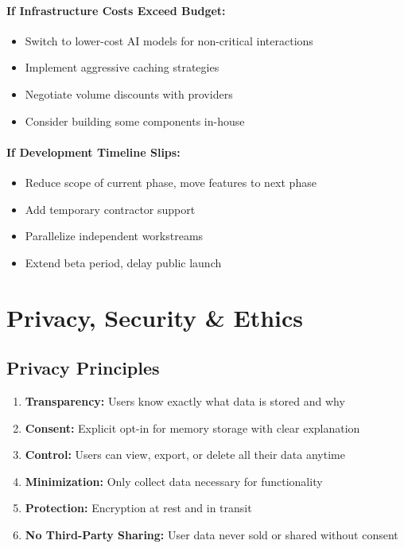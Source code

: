 \documentclass[12pt,a4paper]{article}
\begin{document}
\paragraph{If Infrastructure Costs Exceed Budget:}
\begin{itemize}
    \item Switch to lower-cost AI models for non-critical interactions
    \item Implement aggressive caching strategies
    \item Negotiate volume discounts with providers
    \item Consider building some components in-house
\end{itemize}

\paragraph{If Development Timeline Slips:}
\begin{itemize}
    \item Reduce scope of current phase, move features to next phase
    \item Add temporary contractor support
    \item Parallelize independent workstreams
    \item Extend beta period, delay public launch
\end{itemize}

\section{Privacy, Security \& Ethics}

\subsection{Privacy Principles}

\begin{enumerate}[leftmargin=*]
    \item \textbf{Transparency:} Users know exactly what data is stored and why
    \item \textbf{Consent:} Explicit opt-in for memory storage with clear explanation
    \item \textbf{Control:} Users can view, export, or delete all their data anytime
    \item \textbf{Minimization:} Only collect data necessary for functionality
    \item \textbf{Protection:} Encryption at rest and in transit
    \item \textbf{No Third-Party Sharing:} User data never sold or shared without consent
\end{enumerate}
\end{document}
